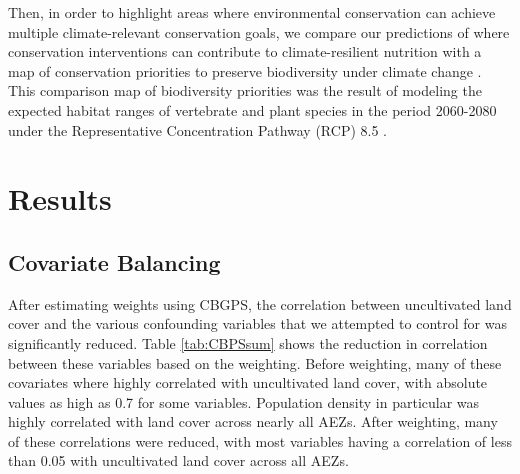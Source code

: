 \documentclass[titlepage]{article}
\begin{document}
Then, in order to highlight areas where environmental conservation can achieve multiple climate-relevant conservation goals, we compare our predictions of where conservation interventions can contribute to climate-resilient nutrition with a map of conservation priorities to preserve biodiversity under climate change \citep{hannah2020}.  This comparison map of biodiversity priorities was the result of modeling the expected habitat ranges of vertebrate and plant species in the period 2060-2080 under the Representative Concentration Pathway (RCP) 8.5 \citep{hannah2020}.

\section{Results}
\subsection{Covariate Balancing}
After estimating weights using CBGPS, the correlation between uncultivated land cover and the various confounding variables that we attempted to control for was significantly reduced.  Table \ref{tab:CBPSsum} shows the reduction in correlation between these variables based on the weighting.  Before weighting, many of these covariates where highly correlated with uncultivated land cover, with absolute values as high as 0.7 for some variables.  Population density in particular was highly correlated with land cover across nearly all AEZs.  After weighting, many of these correlations were reduced, with most variables having a correlation of less than 0.05 with uncultivated land cover across all AEZs.
\end{document}
